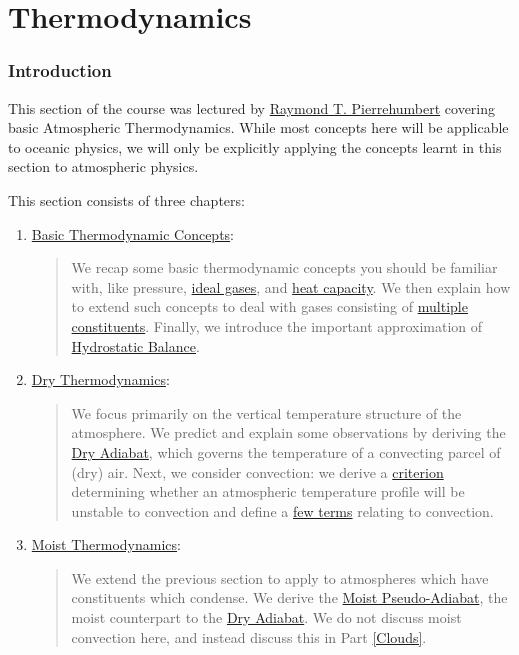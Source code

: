 \part{Thermodynamics}\label{p Thermodynamics}

\section*{Introduction}

This section of the course was lectured by \href{https://users.physics.ox.ac.uk/~pierrehumbert/}{Raymond T. Pierrehumbert} covering basic Atmospheric Thermodynamics. While most concepts here will be applicable to oceanic physics, we will only be explicitly applying the concepts learnt in this section to atmospheric physics.\vspace{5 mm}

\noindent This section consists of three chapters:\vspace{5 mm}

\begin{enumerate}
    \item \hyperref[c Basic Thermodynamics]{Basic Thermodynamic Concepts}: 
        
        \begin{quote}
            We recap some basic thermodynamic concepts you should be familiar with, like pressure, \hyperref[b Ideal Gas]{ideal gases}, and \hyperref[Equipartition]{heat capacity}. We then explain how to extend such concepts to deal with gases consisting of \hyperref[b Definition Multiple]{multiple constituents}. Finally, we introduce the important approximation of \hyperref[Hydrostatic Box]{Hydrostatic Balance}.
        \end{quote}

    \item \hyperref[Dry Thermodynamics]{Dry Thermodynamics}: 
    
        \begin{quote}
            We focus primarily on the vertical temperature structure of the atmosphere. We predict and explain some observations by deriving the \hyperref[Dry Adiabat Box]{Dry Adiabat}, which governs the temperature of a convecting parcel of (dry) air. Next, we consider convection: we derive a \hyperref[Dry Stability Box]{criterion} determining whether an atmospheric temperature profile will be unstable to convection and define a \hyperref[Convection Box]{few terms} relating to convection.
        \end{quote}
    
    \item \hyperref[Moist Thermodynamics]{Moist Thermodynamics}:
        \begin{quote}
            We extend the previous section to apply to atmospheres which have constituents which condense. We derive the \hyperref[Moist Pseudo Adiabat]{Moist Pseudo-Adiabat}, the moist counterpart to the \hyperref[Dry Adiabat Box]{Dry Adiabat}. We do not discuss moist convection here, and instead discuss this in Part \ref{Clouds}.
        \end{quote}
\end{enumerate}

